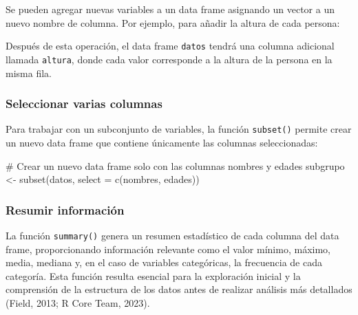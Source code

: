 \documentclass[
  spanish,
  a4paper,
  DIV=11,
  numbers=noendperiod,
  onepage,
  openany]{scrreprt}
\newenvironment{Shaded}{\begin{snugshade}}{\end{snugshade}}
\newcommand{\AttributeTok}[1]{\textcolor[rgb]{0.40,0.45,0.13}{#1}}
\newcommand{\CommentTok}[1]{\textcolor[rgb]{0.37,0.37,0.37}{#1}}
\newcommand{\FloatTok}[1]{\textcolor[rgb]{0.68,0.00,0.00}{#1}}
\newcommand{\FunctionTok}[1]{\textcolor[rgb]{0.28,0.35,0.67}{#1}}
\newcommand{\NormalTok}[1]{\textcolor[rgb]{0.00,0.23,0.31}{#1}}
\newcommand{\OtherTok}[1]{\textcolor[rgb]{0.00,0.23,0.31}{#1}}
\newcommand{\SpecialCharTok}[1]{\textcolor[rgb]{0.37,0.37,0.37}{#1}}
\begin{document}
Se pueden agregar nuevas variables a un data frame asignando un vector a
un nuevo nombre de columna. Por ejemplo, para añadir la altura de cada
persona:

\begin{Shaded}
\end{Shaded}

Después de esta operación, el data frame \texttt{datos} tendrá una
columna adicional llamada \texttt{altura}, donde cada valor corresponde
a la altura de la persona en la misma fila.

\subsubsection{\texorpdfstring{\textbf{Seleccionar varias
columnas}}{Seleccionar varias columnas}}\label{seleccionar-varias-columnas}

Para trabajar con un subconjunto de variables, la función
\texttt{subset()} permite crear un nuevo data frame que contiene
únicamente las columnas seleccionadas:

\begin{Shaded}
\begin{Highlighting}[]
\CommentTok{\# Crear un nuevo data frame solo con las columnas \textquotesingle{}nombres\textquotesingle{} y \textquotesingle{}edades\textquotesingle{}}
\NormalTok{subgrupo }\OtherTok{\textless{}{-}} \FunctionTok{subset}\NormalTok{(datos, }\AttributeTok{select =} \FunctionTok{c}\NormalTok{(nombres, edades))}
\end{Highlighting}
\end{Shaded}

\subsubsection{\texorpdfstring{\textbf{Resumir
información}}{Resumir información}}\label{resumir-informaciuxf3n}

La función \texttt{summary()} genera un resumen estadístico de cada
columna del data frame, proporcionando información relevante como el
valor mínimo, máximo, media, mediana y, en el caso de variables
categóricas, la frecuencia de cada categoría. Esta función resulta
esencial para la exploración inicial y la comprensión de la estructura
de los datos antes de realizar análisis más detallados (Field, 2013; R
Core Team, 2023).
\end{document}
